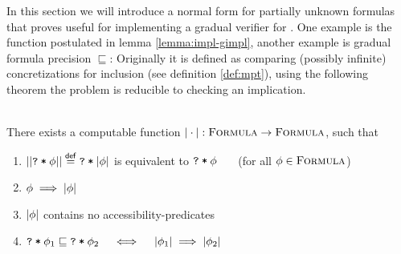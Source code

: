 In this section we will introduce a normal form for partially unknown formulas that proves useful for implementing a gradual verifier for \gvlidf.
One example is the function postulated in lemma \ref{lemma:impl-gimpl}, another example is gradual formula precision $\sqsubseteq$:
Originally it is defined as comparing (possibly infinite) concretizations for inclusion (see definition \ref{def:mpt}), using the following theorem the problem is reducible to checking an implication.

\begin{theorem}\label{thm:gnf}~\\
    There exists a computable function $|\cdot| : \textup{\textsc{Formula}} \rightarrow \textup{\textsc{Formula}}$, such that
    \begin{enumerate}
        \item $||\textup{\texttt{\textup{\texttt{?}}\:*\:\ensuremath{\phi}}}|| \overset{\textup{\textmd{\textsf{def}}}}{=} \textup{\texttt{\textup{\texttt{?}}\:*\:\ensuremath{|\phi|}}}$ is equivalent to $\textup{\texttt{\textup{\texttt{?}}\:*\:\ensuremath{\phi}}}$ ~~~(for all $\phi \in \textup{\textsc{Formula}}$)
        \item $\phi \implies |\phi|$
        \item $|\phi|$ contains no accessibility-predicates
        \item $\textup{\texttt{\textup{\texttt{?}}\:*\:\ensuremath{\phi_1}}} \sqsubseteq \textup{\texttt{\textup{\texttt{?}}\:*\:\ensuremath{\phi_2}}}  \quad\iff\quad  |\phi_1| \implies |\phi_2|$
    \end{enumerate}
\end{theorem}